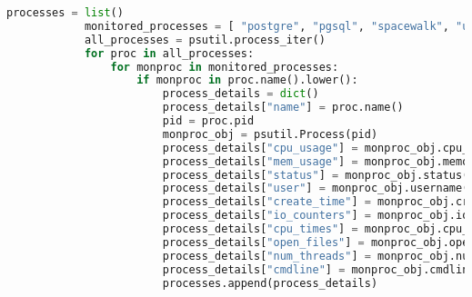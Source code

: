 \begin{lstlisting}[caption={A monitorozáshoz készített, psutil csomagot használó Python-script, mely csv formátumban menti el a metrikákat.},label=lst:python-sysstats,language=Python]
            processes = list()
            monitored_processes = [ "postgre", "pgsql", "spacewalk", "uyuni", "tomcat", "salt", "python" ]
            all_processes = psutil.process_iter()
            for proc in all_processes:
                for monproc in monitored_processes:
                    if monproc in proc.name().lower():
                        process_details = dict()
                        process_details["name"] = proc.name()
                        pid = proc.pid
                        monproc_obj = psutil.Process(pid)
                        process_details["cpu_usage"] = monproc_obj.cpu_percent()
                        process_details["mem_usage"] = monproc_obj.memory_percent()
                        process_details["status"] = monproc_obj.status()
                        process_details["user"] = monproc_obj.username()
                        process_details["create_time"] = monproc_obj.create_time()
                        process_details["io_counters"] = monproc_obj.io_counters()
                        process_details["cpu_times"] = monproc_obj.cpu_times()
                        process_details["open_files"] = monproc_obj.open_files()
                        process_details["num_threads"] = monproc_obj.num_threads()
                        process_details["cmdline"] = monproc_obj.cmdline()
                        processes.append(process_details)




\end{lstlisting}
